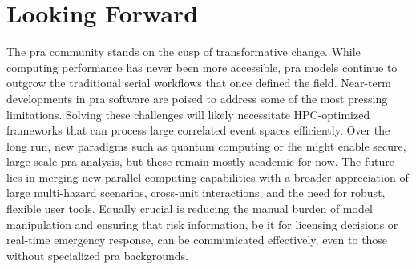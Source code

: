 \section{Looking Forward}
The \acrshort{pra} community stands on the cusp of transformative change. While computing performance has never been more accessible, \acrshort{pra} models continue to outgrow the traditional serial workflows that once defined the field. Near-term developments in \acrshort{pra} software are poised to address some of the most pressing limitations. Solving these challenges will likely necessitate HPC-optimized frameworks that can process large correlated event spaces efficiently. Over the long run, new paradigms such as quantum computing or \acrfull{fhe} might enable secure, large-scale \acrshort{pra} analysis, but these remain mostly academic for now. The future lies in merging new parallel computing capabilities with a broader appreciation of large multi-hazard scenarios, cross-unit interactions, and the need for robust, flexible user tools. Equally crucial is reducing the manual burden of model manipulation and ensuring that risk information, be it for licensing decisions or real-time emergency response, can be communicated effectively, even to those without specialized \acrshort{pra} backgrounds.





